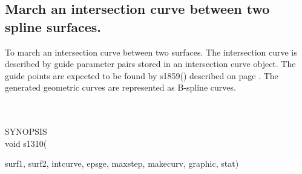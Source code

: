 \subsection{March an intersection curve between two spline surfaces.}
\begin{minipg1}
  To march an intersection curve between two surfaces.
  The intersection curve is described by guide parameter pairs stored in
  an intersection curve object.
  The guide points are expected to be found by s1859() described on
  page \pageref{s1859}.
  The generated geometric curves are represented as B-spline curves.
\end{minipg1} \\ \\
SYNOPSIS\\
        \>void s1310(\begin{minipg3}
                        {\fov surf1}, {\fov surf2}, {\fov intcurve}, {\fov epsge}, {\fov maxstep}, {\fov makecurv}, {\fov graphic}, {\fov stat})
                \end{minipg3}\\[0.3ex]

